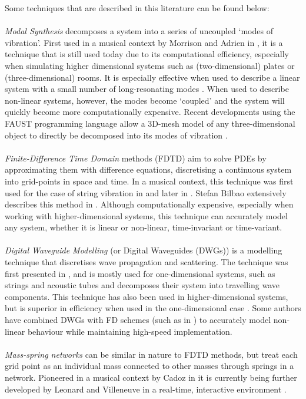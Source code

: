 Some techniques that are described in this literature can be found below:
\\
\\
\textit{Modal Synthesis} decomposes a system into a series of uncoupled `modes of vibration'. First used in a musical context by Morrison and Adrien in \cite{Morrison1993}, it is a technique that is still used today due to its computational efficiency, especially when simulating higher dimensional systems such as (two-dimensional) plates or (three-dimensional) rooms. It is especially effective when used to describe a linear system \cite{Bilbao2018} with a small number of long-resonating modes \cite{Smith2010a}. When used to describe non-linear systems, however, the modes become `coupled’ and the system will quickly become more computationally expensive. Recent developments using the FAUST programming language allow a 3D-mesh model of any three-dimensional object to directly be decomposed into its modes of vibration \cite{MichonMesh2Faust2017}.
\\
\\
\textit{Finite-Difference Time Domain} methods (FDTD) aim to solve PDEs by approximating them with difference equations, discretising a continuous system into grid-points in space and time. In a musical context, this technique was first used for the case of string vibration in \cite{Ruiz1969, Hiller1971I, Hiller1971II} and later in \cite{Chaigne1992, Chaigne1994}. Stefan Bilbao extensively describes this method in \cite{theBible, Bilbao2018}. Although computationally expensive, especially when working with higher-dimensional systems, this technique can accurately model any system, whether it is linear or non-linear, time-invariant or time-variant.
\\
\\
\textit{Digital Waveguide Modelling} (or Digital Waveguides (DWGs)) is a modelling technique that discretises wave propagation and scattering. The technique was first presented in \cite{Smith1992}, and is mostly used for one-dimensional systems, such as strings and acoustic tubes and decomposes their system into travelling wave components. This technique has also been used in higher-dimensional systems, but is superior in efficiency when used in the one-dimensional case \cite{Valimaki2006}. Some authors have combined DWGs with FD schemes (such as in \cite{Erkut2002, Maestre2014}) to accurately model non-linear behaviour while maintaining high-speed implementation.
\\
\\
\textit{Mass-spring networks} can be similar in nature to FDTD methods, but treat each grid point as an individual mass connected to other masses through springs in a network. Pioneered in a musical context by Cadoz in \cite{Cadoz1979, Cadoz1983, Cadoz1993} it is currently being further developed by Leonard and Villeneuve in a real-time, interactive environment \cite{Villeneuve2019, Leonard2019}.

